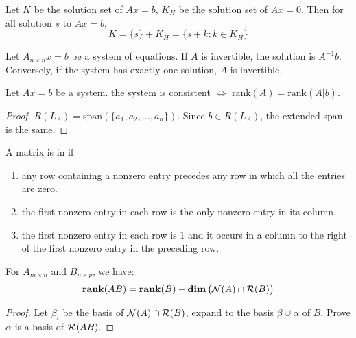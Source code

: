 \begin{theorem}\label{equationfromoneandnullspace}
	Let $K$ be the solution set of $Ax=b$, $K_H$ be the solution set of $Ax=0$. Then for all solution $s$ to $Ax=b$,
	\begin{equation}
		K = \{ s \} + K_H = \{s+k: k \in K_H \}
	\end{equation}
\end{theorem}


\begin{theorem}
	Let $A_{n \times n}x=b$ be a system of equations. If $A$ is invertible, the solution is $A^{-1}b$. Conversely, if the system has exactly one solution, $A$ is invertible.
\end{theorem}



\begin{theorem}
	Let $Ax=b$ be a system. the system is consistent $\Leftrightarrow$ $\text{rank}(A) = \text{rank}(A|b)$.
\end{theorem}

\begin{proof}
    $R(L_A) = \text{span}(\{a_1, a_2, \dots, a_n \})$. Since $b \in R(L_A)$, the extended span is the same.
\end{proof}


\begin{definition}
	A matrix is in  if 
	\begin{enumerate}
		\item any row containing a nonzero entry precedes any row in which all the entries are zero.
		\item the first nonzero entry in each row is the only nonzero entry in its column.
		\item the first nonzero entry in each row is $1$ and it occurs in a column to the right of the first nonzero entry in the preceding row.
	\end{enumerate}
\end{definition}

\begin{theorem}\label{rankoftwomatrix}
    For $A_{m \times n}$ and $B_{n \times p}$, we have:
    \begin{equation}
        \displaystyle \mathbf{rank}( AB ) = \displaystyle \mathbf{rank}( B ) - \displaystyle \mathbf{dim}\left( \mathcal{N}(A) \cap \mathcal{R}(B) \right)
    \end{equation}
\end{theorem}
\begin{proof}
    Let $\beta_i$ be the basis of $\mathcal{N}(A) \cap \mathcal{R}(B)$, expand to the basis $\beta \cup \alpha$ of $B$. Prove $\alpha$ is a basis of $\mathcal{R}(AB)$.
\end{proof}

